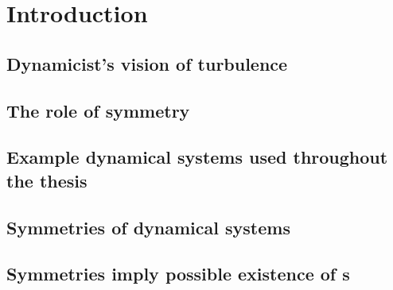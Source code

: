 
\ifboyscout \pagestyle{headings} \fi  %

\chapter{Introduction}
%

	\section{Dynamicist's vision of turbulence}
	\label{s:hopf}
    	
	\section{The role of symmetry}
	\label{s:symIntro}
        
	
	\section{Example dynamical systems used throughout the thesis}
	\label{s:exampleIntro}
	


 \section{Symmetries of dynamical systems}
    

  \section{Symmetries imply possible existence of \rpo s}
        \label{sec:SymRPO}
        
    \PublicPrivate{}{
        
                    }%

